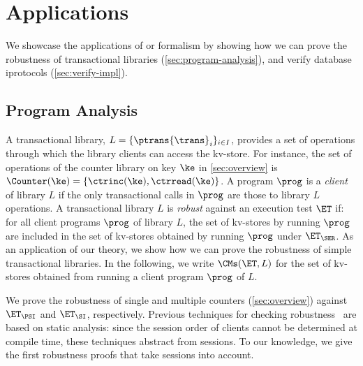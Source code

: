 \vspace*{-5pt}
\section{Applications}
\vspace*{-5pt}
\label{sec:applications}

We showcase the applications of or formalism by showing how we can prove the robustness of transactional libraries (\cref{sec:program-analysis}), and verify database iprotocols
 (\cref{sec:verify-impl}).

\vspace*{-4pt}
\subsection{Program Analysis}
\vspace*{-4pt}
\label{sec:program-analysis}
A transactional library, $L = \{\ptrans{\trans}_{i}\}_{i \in I}$, 
provides a set of operations through which the library clients can access the kv-store. 
For instance, the set of operations of the counter library on key $\ke$ in \cref{sec:overview} is $\Counter(\ke) = \{\ctrinc(\ke), \ctrread(\ke)\}$.
A program $\prog$ is a \emph{client} of library $L$ if the only transactional calls in $\prog$ are those to library $L$ operations.  
A transactional library $L$ is \emph{robust} against an execution test $\ET$ if: 
for all client programs $\prog$ of library $L$, the set of kv-stores by running $\prog$ are included in the set of kv-stores obtained by running $\prog$ under $\ET_{\SER}$.
As an application of our theory, we show how we can prove the robustness of simple transactional libraries. 
In the following, we write $\CMs(\ET, L)$ for the set of kv-stores obtained from running a client program $\prog$ of $L$. 

We prove the robustness of single and multiple counters (\cref{sec:overview}) against $\ET_{\PSI}$ and $\ET_{\SI}$, respectively.
Previous techniques for checking robustness~\cite{giovanni_concur16,SIanalysis,laws,sureshConcur} 
are based on static analysis: since the session order of clients cannot be determined at compile 
time, these techniques abstract from sessions. 
To our knowledge, we give the first robustness proofs that take sessions into account.

